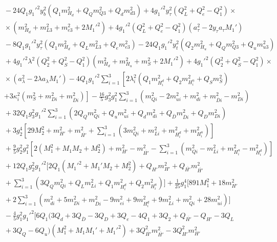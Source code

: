 \documentclass[preprint,amsmath,amssymb,aps,superscriptaddress,prd,showpacs,floatfix,nofootinbib]{revtex4-1}
\begin{document}
\begin{subequations}
\begin{align}
&{}-24Q_1g_1'^2y_b^2\left ( Q_1m_{H_d}^2+Q_Qm_{Q3}^2+Q_dm_{d3}^2\right )+4g_1'^2y_\tau^2\left ( Q_L^2+Q_e^2-Q_1^2\right )\times\nonumber\\
&{}\times\left ( m_{H_d}^2+m_{L3}^2+m_{e3}^2+2M_1'^2\right )+4g_1'^2\left ( Q_L^2+Q_e^2-Q_1^2\right )\left ( a_\tau^2-2y_\tau a_\tau M_1'\right )\nonumber\\
&{}-8Q_1g_1'^2y_\tau^2\left ( Q_1m_{H_d}^2+Q_Lm_{L3}^2+Q_em_{e3}^2\right )-24Q_1g_1'^2y_t^2\left ( Q_2m_{H_u}^2+Q_Qm_{Q3}^2+Q_um_{u3}^2\right )\nonumber\\
&{}+4g_1'^2\lambda^2\left ( Q_2^2+Q_S^2-Q_1^2\right )\left ( m_{H_d}^2+m_{H_u}^2+m_S^2+2M_1'^2\right )+4g_1'^2\left ( Q_2^2+Q_S^2-Q_1^2\right )\times\nonumber\\
&{}\times\left ( a_\lambda^2-2\lambda a_\lambda M_1'\right )-4Q_1g_1'^2\sum_{i=1}^3\left [ 2\lambda_i^2\left ( Q_1m_{H_i^d}^2+Q_2m_{H_i^u}^2+Q_Sm_S^2\right )\right.\nonumber\\
&{}\left.+3\kappa_i^2\left ( m_S^2+m_{Di}^2+m_{\overline{D}i}^2\right )\right ]-\frac{16}{5}g_3^2g_1^2\sum_{i=1}^3\left ( m_{Qi}^2-2m_{ui}^2+m_{di}^2+m_{\overline{D}i}^2-m_{Di}^2\right )\nonumber\\
&{}+32Q_1g_3^2g_1'^2\sum_{i=1}^3\left ( 2Q_Qm_{Qi}^2+Q_um_{ui}^2+Q_dm_{di}^2+Q_{\overline{D}}m_{\overline{D}i}^2+Q_Dm_{Di}^2\right )\nonumber\\
&{}+3g_2^4\left [ 29M_2^2+m_{H'}^2+m_{\overline{H'}}^2+\sum_{i=1}^3\left ( 3m_{Qi}^2+m_{Li}^2+m_{H_i^d}^2+m_{H_i^u}^2\right )\right ]\nonumber\\
&{}+\frac{9}{5}g_2^2g_1^2\left [ 2\left ( M_1^2+M_1M_2+M_2^2\right )+m_{H'}^2-m_{\overline{H'}}^2-\sum_{i=1}^3\left ( m_{Qi}^2-m_{Li}^2+m_{H_i^u}^2-m_{H_i^d}^2\right )\right ]\nonumber\\
&{}+12Q_1g_2^2g_1'^2\bigg [ 2Q_1\left ( M_1'^2+M_1'M_2+M_2^2\right )+Q_{H'}m_{H'}^2+Q_{\overline{H'}}m_{\overline{H'}}^2\nonumber\\
&{}+\sum_{i=1}^3\left ( 3Q_Qm_{Qi}^2+Q_Lm_{Li}^2+Q_1m_{H_i^d}^2+Q_2m_{H_i^u}^2\right )\bigg ]+\frac{1}{25}g_1^4\bigg [ 891M_1^2+18m_{H'}^2\nonumber\\
&{}+2\sum_{i=1}^3\left ( m_{di}^2+5m_{Di}^2+m_{\overline{D}i}^2-9m_{ei}^2+9m_{H_i^d}^2+9m_{Li}^2+m_{Qi}^2+28m_{ui}^2\right )\bigg ]\nonumber\\
&{}-\frac{4}{5}g_1^2g_1'^2\bigg [ 6Q_1\big ( 3Q_d+3Q_{\overline{D}}-3Q_D+3Q_e-4Q_1+3Q_2+Q_{\overline{H'}}-Q_{H'}-3Q_L\nonumber\\
&{}+3Q_Q-6Q_u\big )\left ( M_1^2+M_1M_1'+M_1'^2\right )+3Q_{\overline{H'}}^2m_{\overline{H'}}^2-3Q_{H'}^2m_{H'}^2\nonumber\\

\end{align}
\end{subequations}
\end{document}
